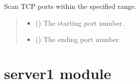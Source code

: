 \documentclass[letterpaper,10pt,english]{sphinxmanual}
\begin{document}

\begin{fulllineitems}
\label{\detokenize{portscanner:portscanner.scantcp}}
\pysigstartsignatures
{}
\pysigstopsignatures
\sphinxAtStartPar
Scan TCP ports within the specified range.
\begin{quote}\begin{description}
\begin{itemize}
\item {} 
\sphinxAtStartPar
{} () \textendash{} The starting port number.

\item {} 
\sphinxAtStartPar
{} () \textendash{} The ending port number.

\end{itemize}

\end{description}\end{quote}

\end{fulllineitems}


\sphinxstepscope


\section{server1 module}
\label{\detokenize{server1:module-server1}}\label{\detokenize{server1:server1-module}}\label{\detokenize{server1::doc}}
\end{document}
